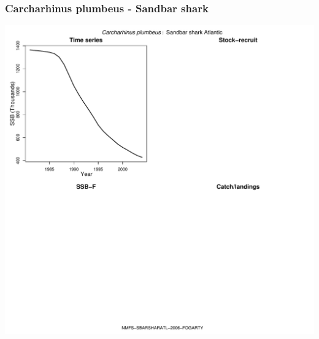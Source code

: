 \subsubsection{Carcharhinus plumbeus - Sandbar shark}
\begin{center}
\includegraphics[width=1.2\textwidth]{../R/figures/NMFS-SBARSHARATL-2006-FOGARTY.pdf}
\end{center}

